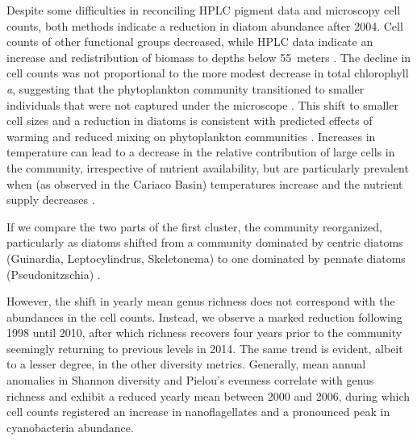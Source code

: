 Despite some difficulties in reconciling HPLC pigment data and microscopy cell counts, both methods indicate a reduction in diatom abundance after 2004. Cell counts of other functional groups decreased, while HPLC data indicate an increase and redistribution of biomass to depths below \qty{55}{meters} \cite{pinckney_phytoplankton_2015}. The decline in cell counts was not proportional to the more modest decrease in total chlorophyll \textit{a}, suggesting that the phytoplankton community transitioned to smaller individuals that were not captured under the microscope \cite{muller-karger_scientific_2019}. This shift to smaller cell sizes and a reduction in diatoms is consistent with predicted effects of warming and reduced mixing on phytoplankton communities \cite{bopp_response_2005}. Increases in temperature can lead to a decrease in the relative contribution of large cells in the community, irrespective of nutrient availability, but are particularly prevalent when (as observed in the Cariaco Basin) temperatures increase and the nutrient supply decreases \cite{mousing_global_2014}. 

If we compare the two parts of the first cluster, the community reorganized, particularly as diatoms shifted from a community dominated by centric diatoms (Guinardia, Leptocylindrus, Skeletonema) to one dominated by pennate diatoms (Pseudonitzschia) \cite{pinckney_phytoplankton_2015}.

However, the shift in yearly mean genus richness does not correspond with the abundances in the cell counts. Instead, we observe a marked reduction following 1998 until 2010, after which richness recovers four years prior to the community seemingly returning to previous levels in 2014. The same trend is evident, albeit to a lesser degree, in the other diversity metrics. Generally, mean annual anomalies in Shannon diversity and Pielou's evenness correlate with genus richness and exhibit a reduced yearly mean between 2000 and 2006, during which cell counts registered an increase in nanoflagellates and a pronounced peak in cyanobacteria abundance. %

